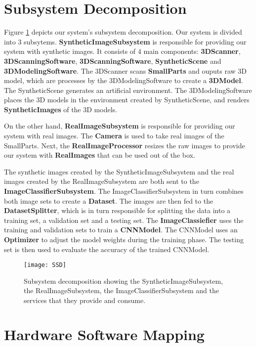 \section{Subsystem Decomposition}\label{sec:subsystem_decomposition}

Figure \ref{fig:SSD} depicts our system's subsystem decomposition. Our system is divided into 3 subsytems. \textbf{SyntheticImageSubsystem} is responsible for providing our system with synthetic images. It consists of 4 main components: \textbf{3DScanner}, \textbf{3DScanningSoftware}, \textbf{3DScanningSoftware}, \textbf{SyntheticScene} and \textbf{3DModelingSoftware}. The 3DScanner scans \textbf{SmallParts} and ouputs raw 3D model, which are processes by the 3DModelingSoftware to create a \textbf{3DModel}. The SyntheticScene generates an artificial environment. The 3DModelingSoftware places the 3D models in the environment created by SyntheticScene, and renders \textbf{SyntheticImages} of the 3D models.

On the other hand, \textbf{RealImageSubsystem} is responsible for providing our system with real images. The \textbf{Camera} is used to take real images of the SmallParts. Next, the \textbf{RealImageProcessor} resizes the raw images to provide our system with \textbf{RealImages} that can be used out of the box.

The synthetic images created by the SyntheticImageSubsystem and the real images created by the RealImageSubsystem are both sent to the \textbf{ImageClassifierSubsystem}. The ImageClassifierSubsystem in turn combines both image sets to create a \textbf{Dataset}. The images are then fed to the \textbf{DatasetSplitter}, which is in turn responsible for splitting the data into a training set, a validation set and a testing set. The \textbf{ImageClassiefier} uses the training and validation sets to train a \textbf{CNNModel}. The CNNModel uses an \textbf{Optimizer} to adjust the model weights during the training phase. The testing set is then used to evaluate the accuracy of the trained CNNModel.

\begin{figure}[H]
\centering
  \texttt{[image: SSD]}
\caption{Subsystem decomposition showing the SyntheticImageSubsystem, the RealImageSubsystem, the ImageClassifierSubsystem and the services that they provide and consume.}
\label{fig:SSD}
\end{figure}


\section{Hardware Software Mapping}\label{sec:hardware_software_mapping}

